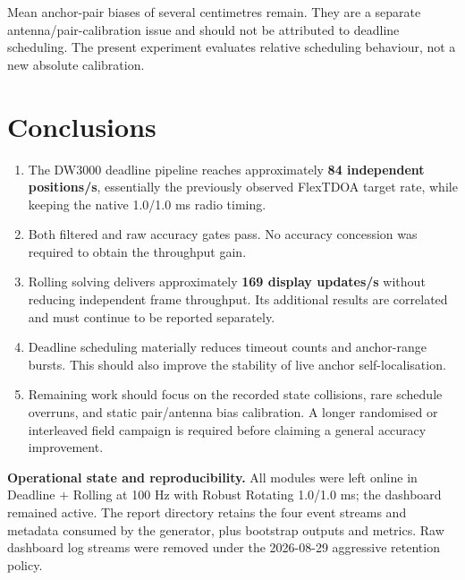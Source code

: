 \documentclass[11pt,a4paper]{article}
\begin{document}
Mean anchor-pair biases of several centimetres remain. They are a separate
antenna/pair-calibration issue and should not be attributed to deadline
scheduling. The present experiment evaluates relative scheduling behaviour,
not a new absolute calibration.

\FloatBarrier
\section{Conclusions}

\begin{enumerate}[itemsep=2pt,topsep=3pt]
\item The DW3000 deadline pipeline reaches approximately
\textbf{84 independent positions/s}, essentially the previously observed
FlexTDOA target rate, while keeping the native 1.0/1.0 ms radio timing.
\item Both filtered and raw accuracy gates pass. No accuracy concession was
required to obtain the throughput gain.
\item Rolling solving delivers approximately \textbf{169 display updates/s}
without reducing independent frame throughput. Its additional results are
correlated and must continue to be reported separately.
\item Deadline scheduling materially reduces timeout counts and anchor-range
bursts. This should also improve the stability of live anchor self-localisation.
\item Remaining work should focus on the recorded state collisions, rare
schedule overruns, and static pair/antenna bias calibration. A longer
randomised or interleaved field campaign is required before claiming a general
accuracy improvement.
\end{enumerate}

\medskip
\noindent\textbf{Operational state and reproducibility.}
All modules were left online in Deadline + Rolling at 100 Hz with Robust
Rotating 1.0/1.0 ms; the dashboard remained active. The report directory
retains the four event streams and metadata consumed by the generator, plus
bootstrap outputs and metrics. Raw dashboard log streams were removed under
the 2026-08-29 aggressive retention policy.
\end{document}
